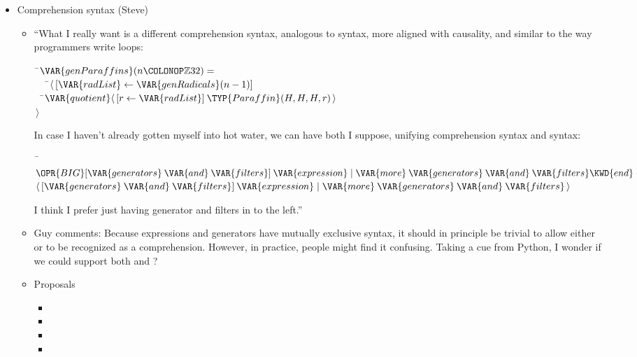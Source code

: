 \begin{itemize}
\item Comprehension syntax (Steve)
  \begin{itemize}
\item ``What I really want is a different comprehension syntax,
analogous to  syntax, more aligned with causality,
and similar to the way programmers write loops:
\begin{Fortress}
{\tt~}\pushtabs\=\+\( \VAR{genParaffins} (n\COLONOP\mathbb{Z}32) =\)\\
{\tt~~~}\pushtabs\=\+\(    \langle\,[\VAR{radList} \leftarrow \VAR{genRadicals}(n-1)]\)\\
{\tt~~}\pushtabs\=\+\(      \VAR{quotient} \langle\,[r \leftarrow \VAR{radList}]\:\TYP{Paraffin} (H, H, H, r)\,\rangle\)\-\\\poptabs
\(   \,\rangle\)\-\-\\\poptabs\poptabs
\end{Fortress}
      In case I haven't already gotten myself into hot water,
we can have both I suppose, unifying comprehension syntax and  syntax:
\begin{Fortress}
{\tt~}\pushtabs\=\+\( \OPR{BIG} [\VAR{generators}\:\VAR{and}\:\VAR{filters}]\:\VAR{expression} \mid \VAR{more}\:\VAR{generators}\:\VAR{and}\:\VAR{filters} \KWD{end}\)\\
\( \langle\,[\VAR{generators}\:\VAR{and}\:\VAR{filters}]\:\VAR{expression} \mid \VAR{more}\:\VAR{generators}\:\VAR{and}\:\VAR{filters}\,\rangle\)\-\\\poptabs
\end{Fortress}
      I think I prefer just having generator and filters in \EXP{[\,]} to the left.''
\item Guy comments: Because expressions and generators have mutually exclusive syntax,
it should in principle be trivial to allow either
 or
 to be
recognized as a comprehension. However, in practice, people might find it confusing.
Taking a cue from Python, I wonder if we could support both
 and
?

\item Proposals
  \begin{itemize}
\item {}
\item {}
\item {}
\item {}
  \end{itemize}
  \end{itemize}


\end{itemize}
